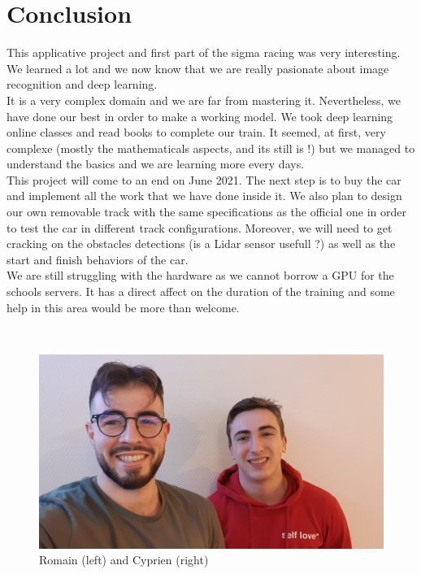 \section{Conclusion}
This applicative project and first part of the sigma racing was very interesting. \\
We learned a lot and we now know that we are really pasionate about image recognition and deep learning.\\

It is a very complex domain and we are far from mastering it. Nevertheless, we have done our best in order to make a working model. We took deep learning online classes and read books to complete our train. It seemed, at first, very complexe (mostly the mathematicals aspects, and its still is !) but we managed to understand the basics and we are learning more every days.\\

This project will come to an end on June 2021. The next step is to buy the car and implement all the work that we have done inside it. We also plan to design our own removable track with the same specifications as the official one in order to test the car in different track configurations. Moreover, we will need to get cracking on the obstacles detections (is a Lidar sensor usefull ?) as well as the start and finish behaviors of the car.\\

We are still struggling with the hardware as we cannot borrow a GPU for the schools servers. It has a direct affect on the duration of the training and some help in this area would be more than welcome.

\hfill \\ 

\begin{figure}[!h]
\centering
\includegraphics[scale=0.15]{img/girou_barbault.jpg}
\caption{Romain (left) and Cyprien (right)}
\end{figure}
\clearpage